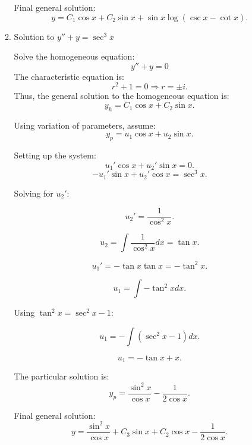 \documentclass[12pt]{article}
\begin{document}
\begin{enumerate}
\begin{enumerate}
        Final general solution:
        \[
        y = C_1 \cos x + C_2 \sin x + \sin x \log (\csc x - \cot x).
        \]

    

    \item Solution to \( y'' + y = \sec^3 x \)

        Solve the homogeneous equation:
        \[
        y'' + y = 0
        \]
        The characteristic equation is:
        \[
        r^2 + 1 = 0 \Rightarrow r = \pm i.
        \]
        Thus, the general solution to the homogeneous equation is:
        \[
        y_h = C_1 \cos x + C_2 \sin x.
        \]

        Using variation of parameters, assume:
        \[
        y_p = u_1 \cos x + u_2 \sin x.
        \]

        Setting up the system:
        \[
        u_1' \cos x + u_2' \sin x = 0.
        \]
        \[
        - u_1' \sin x + u_2' \cos x = \sec^3 x.
        \]

        Solving for \( u_2' \):

        \[
        u_2' = \frac{1}{\cos^2 x}.
        \]

        \[
        u_2 = \int \frac{1}{\cos^2 x} dx = \tan x.
        \]

        \[
        u_1' = -\tan x \tan x = -\tan^2 x.
        \]

        \[
        u_1 = \int -\tan^2 x dx.
        \]

        Using \( \tan^2 x = \sec^2 x - 1 \):

        \[
        u_1 = -\int (\sec^2 x - 1) dx.
        \]

        \[
        u_1 = -\tan x + x.
        \]

        The particular solution is:
        \[
        y_p = \frac{\sin^2 x}{\cos x} - \frac{1}{2 \cos x}.
        \]

        Final general solution:
        \[
        y = \frac{\sin^2 x}{\cos x} + C_3 \sin x + C_2 \cos x - \frac{1}{2 \cos x}.
        \]



\end{enumerate}
\end{enumerate}
\end{document}
